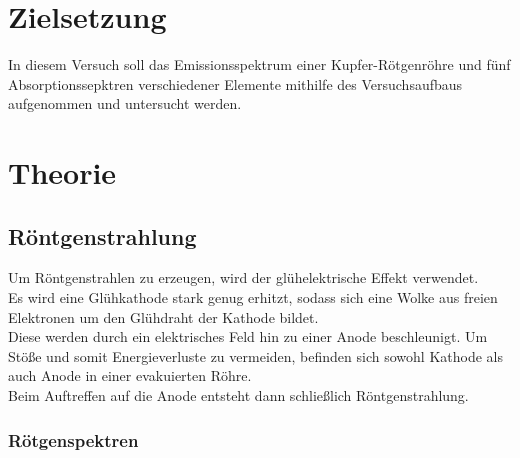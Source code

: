 \section{Zielsetzung}
\label{sec:Zielsetzung}

In diesem Versuch soll das Emissionsspektrum einer Kupfer-Rötgenröhre und 
fünf Absorptionssepktren verschiedener Elemente mithilfe des Versuchsaufbaus
aufgenommen und untersucht werden.

\section{Theorie}
\label{sec:Theorie}

\subsection{Röntgenstrahlung}

Um Röntgenstrahlen zu erzeugen, wird der glühelektrische Effekt verwendet.\\
Es wird eine Glühkathode stark genug erhitzt, sodass sich eine Wolke aus freien
Elektronen um den Glühdraht der Kathode bildet.\\
Diese werden durch ein elektrisches Feld hin zu einer Anode beschleunigt.
Um Stöße und somit Energieverluste zu vermeiden, befinden sich sowohl Kathode
als auch Anode in einer evakuierten Röhre.\\
Beim Auftreffen auf die Anode entsteht dann schließlich Röntgenstrahlung.\\

\subsubsection{Rötgenspektren}


